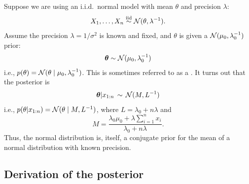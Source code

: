 \documentclass[12pt]{article}
\begin{document}
Suppose we are using an i.i.d.\ normal model with mean $\theta$ and precision $\lambda$:
$$ X_1,\dotsc,X_n\stackrel{\mathrm{iid}}{\sim}\mathcal{N}(\theta,\lambda^{-1}). $$
Assume the precision $\lambda = 1/\sigma^2$ is known and fixed, and $\theta$ is given a $\mathcal{N}(\mu_0,\lambda_0^{-1})$ prior:
$${\bm\theta} \sim \mathcal{N}(\mu_0,\lambda_0^{-1})$$
i.e., $p(\theta) = \mathcal{N}(\theta\mid \mu_0,\lambda_0^{-1})$. This is sometimes referred to as a .
It turns out that the posterior is
\begin{align}\label{equation:posterior}
{\bm\theta}|x_{1:n}\, \sim \,\mathcal{N}(M,L^{-1})
\end{align}
i.e., $p(\theta|x_{1:n}) =\mathcal{N}(\theta\mid M,L^{-1})$, where $L =\lambda_0+ n\lambda$ and
$$M =\frac{\lambda_0\mu_0+\lambda\sum_{i = 1}^n x_i}{\lambda_0+ n\lambda}.$$
Thus, the normal distribution is, itself, a conjugate prior for the mean of a normal distribution with known precision.

\subsection{Derivation of the posterior}
\end{document}
